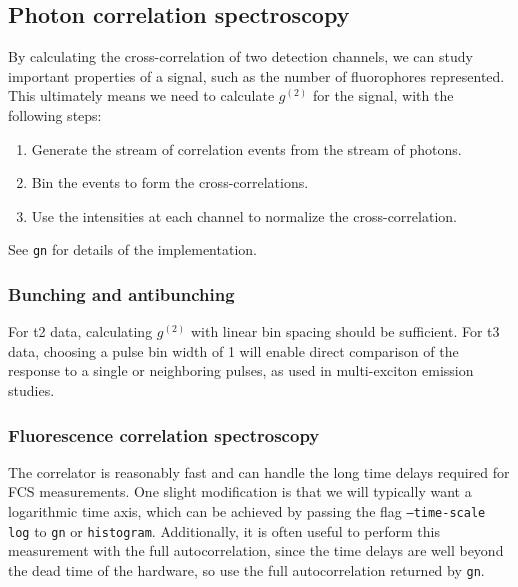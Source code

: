 \documentclass{article}
\newcommand{\histogram}{\texttt{histogram}}
\newcommand{\gn}[1]{\ensuremath{g^{(#1)}}}
\newcommand{\GN}{\texttt{gn}}
\begin{document}
\subsection{Photon correlation spectroscopy}
By calculating the cross-correlation of two detection channels, we can study important properties of a signal, such as the number of fluorophores represented. This ultimately means we need to calculate \gn{2} for the signal, with the following steps:
\begin{enumerate}
\item Generate the stream of correlation events from the stream of photons.
\item Bin the events to form the cross-correlations.
\item Use the intensities at each channel to normalize the cross-correlation.
\end{enumerate}
See \GN{} for details of the implementation.

\subsubsection{Bunching and antibunching}
For t2 data, calculating \gn{2} with linear bin spacing should be sufficient. For t3 data, choosing a pulse bin width of 1 will enable direct comparison of the response to a single or neighboring pulses, as used in multi-exciton emission studies.

\subsubsection{Fluorescence correlation spectroscopy}
The correlator is reasonably fast and can handle the long time delays required for FCS measurements. One slight modification is that we will typically want a logarithmic time axis, which can be achieved by passing the flag \texttt{--time-scale log} to \GN{} or \histogram. Additionally, it is often useful to perform this measurement with the full autocorrelation, since the time delays are well beyond the dead time of the hardware, so use the full autocorrelation returned by \GN.
\end{document}
